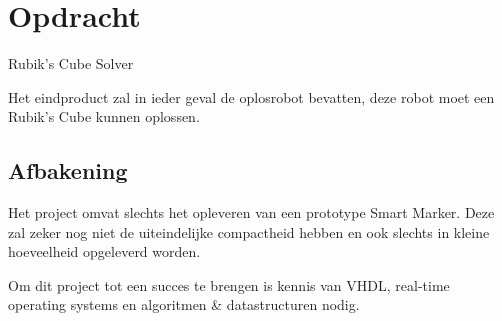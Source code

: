 \section{Opdracht}
Rubik's Cube Solver

Het eindproduct zal in ieder geval de oplosrobot bevatten, deze robot
moet een Rubik's Cube kunnen oplossen.

\subsection{Afbakening}
Het project omvat slechts het opleveren van een prototype Smart Marker. Deze zal 
zeker nog niet de uiteindelijke compactheid hebben en ook slechts in kleine 
hoeveelheid opgeleverd worden.

Om dit project tot een succes te brengen is kennis van VHDL, real-time
operating systems en algoritmen \& datastructuren nodig.
